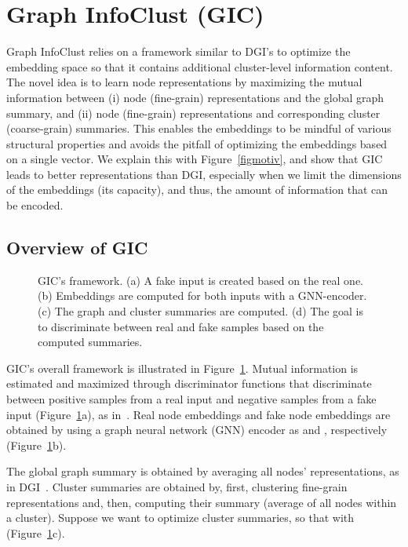 \documentclass{article}
\begin{document}
\section{Graph InfoClust (GIC)}

Graph InfoClust relies on a framework similar to DGI's to optimize the embedding space so that it contains additional cluster-level information content. The novel idea is to learn node representations by maximizing the mutual information between (i) node (fine-grain) representations and the global graph summary, and (ii) node (fine-grain) representations and corresponding cluster (coarse-grain) summaries. This enables the embeddings to be mindful of various structural properties and avoids the pitfall of optimizing the embeddings based on a single vector. We explain this with Figure~\ref{figmotiv}, and show that GIC leads to better representations than DGI, especially when we limit the dimensions  of the embeddings (its capacity), and thus, the amount of information that can be encoded.


\subsection{Overview of GIC}


\begin{figure}[t!]
    \centering
    
    \caption{GIC's framework. (a) A fake input is created based on the real one. (b) Embeddings are computed for both inputs with a GNN-encoder. (c) The graph and cluster summaries are computed. (d) The goal is to discriminate between real and fake samples based on the computed summaries. }
    \label{figframe}
\end{figure}

GIC's overall framework is illustrated in Figure~\ref{figframe}. Mutual information is estimated and maximized through discriminator functions that discriminate between positive samples from a real input and negative samples from a fake input  (Figure~\ref{figframe}a), as in~\cite{velickovic2018deep, hjelm2018learning, oord2018representation}.
Real node embeddings  and fake node embeddings  are obtained by using a graph neural network (GNN) encoder  as  and , respectively (Figure~\ref{figframe}b).


The global graph summary  is obtained by averaging all nodes' representations, as in DGI~\cite{velickovic2018deep}. Cluster summaries  are obtained by, first, clustering fine-grain representations and, then, computing their summary (average of all nodes within a cluster). Suppose we want to optimize  cluster summaries, so that  with  (Figure~\ref{figframe}c). 
\end{document}

